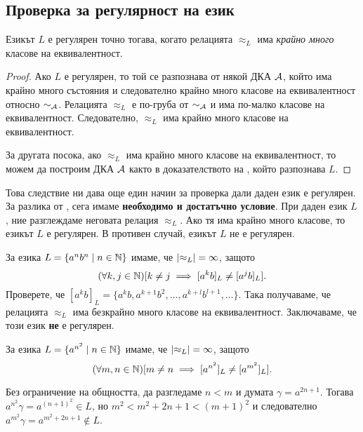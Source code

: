 \subsection*{Проверка за регулярност на език}

\begin{framed}
  \begin{prop}
    Езикът $L$ е регулярен точно тогава, когато релацията $\approx_L$ има {\em крайно много} класове на еквивалентност.
  \end{prop}
\end{framed}
\begin{proof}
  Ако $L$ е регулярен, то той се разпознава от някой ДКА $\mathcal{A}$, който има крайно много състояния 
  и следователно крайно много класове на еквивалентност относно $\sim_{\mathcal{A}}$.
  Релацията $\approx_L$ е по-груба от $\sim_{\mathcal{A}}$ и има по-малко класове на еквивалентност.
  Следователно, $\approx_L$ има крайно много класове на еквивалентност.
  
  За другата посока, ако $\approx_L$ има крайно много класове на еквивалентност, то можем да 
  построим ДКА $\mathcal{A}$ както в доказателството на , който разпознава $L$.
\end{proof}

Това следствие ни дава още един начин за проверка дали даден език е регулярен.
За разлика от , сега имаме {\bf необходимо и достатъчно условие}.
При даден език $L$, ние разглеждаме неговата релация $\approx_L$.
Ако тя има крайно много класове, то езикът $L$ е регулярен.
В противен случай, езикът $L$ не е регулярен.

\begin{example}
  За езика $L = \{a^nb^n\mid n \in \mathbb{N}\}$ имаме, че $\lvert{\approx_L}\rvert = \infty$,
  защото \[(\forall k,j\in\mathbb{N})[k \neq j \implies [a^kb]_L \neq [a^jb]_L].\]
  Проверете, че $[a^kb]_L = \{a^kb,a^{k+1}b^{2},\dots,a^{k+l}b^{l+1},\dots\}$.
  Така получаваме, че релацията $\approx_L$ има безкрайно много класове на еквивалентност.
  Заключаваме, че този език {\bf не} е регулярен.
\end{example}

\begin{example}
  За езика $L = \{a^{n^2} \mid n \in \mathbb{N}\}$ имаме, че $\lvert{\approx_L}\rvert = \infty$,
  защото \[(\forall m,n\in\mathbb{N})[m \neq n \implies [a^{n^2}]_L \neq [a^{m^2}]_L].\]
  
  Без ограничение на общността, да разгледаме $n < m$ и думата $\gamma = a^{2n+1}$.
  Тогава $a^{n^2}\gamma = a^{(n+1)^2} \in L$, но 
  $m^2 < m^2 + 2n + 1 < (m+1)^2$ и следователно $a^{m^2}\gamma = a^{m^2+2n+1}\not\in L$.
\end{example}

